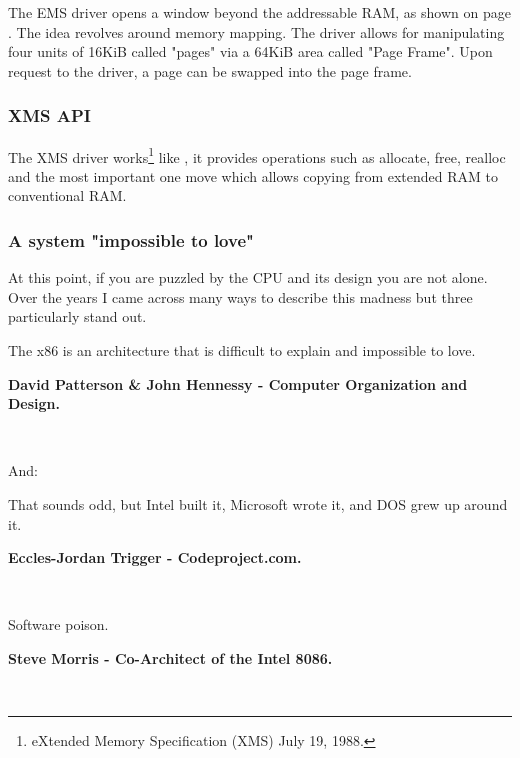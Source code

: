 \documentclass[book.tex]{subfiles}
\begin{document}
The EMS driver opens a window beyond the addressable RAM, as shown on page \pageref{fig:ems_xms_layout}. The idea revolves around memory mapping. The driver allows for manipulating four units of 16KiB called "pages" via a 64KiB area called "Page Frame". Upon request to the driver, a page can be swapped into the page frame.\\
\par



\subsubsection{XMS API}
The XMS driver works\footnote{eXtended Memory Specification (XMS) July 19, 1988.} like , it provides operations such as allocate, free, realloc and the most important one move which allows copying from extended RAM to conventional RAM.








\subsubsection{A system "impossible to love"}
At this point, if you are puzzled by the CPU and its design you are not alone. Over the years I came across many ways to describe this madness but three particularly stand out.\\
\par
 \begin{fancyquotes}
   The x86 is an architecture that is difficult to explain and impossible to love.\\
   \par
\textbf{David Patterson \& John Hennessy - Computer Organization and Design.}
 \end{fancyquotes}\\
\par
And:\\
\par
 \begin{fancyquotes}
    That sounds odd, but Intel built it, Microsoft wrote it, and DOS grew up around it.\\
   \par
\textbf{Eccles-Jordan Trigger - Codeproject.com.}
 \end{fancyquotes}\\
\par
 \begin{fancyquotes}
    Software poison.\\
   \par
\textbf{Steve Morris - Co-Architect of the Intel 8086.}
 \end{fancyquotes}\\
\end{document}
